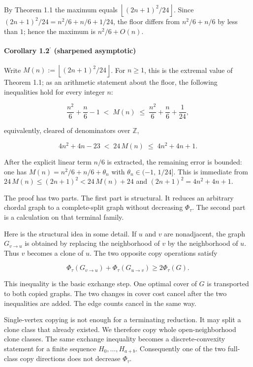 \documentclass[english,11pt,a4paper]{article}
\begin{document}
By Theorem 1.1 the maximum equals
\(\left\lfloor(2n+1)^2/24\right\rfloor\). Since
\((2n+1)^2/24=n^2/6+n/6+1/24\), the floor differs from \(n^2/6+n/6\) by
less than \(1\); hence the maximum is \(n^2/6+O(n)\).

\paragraph{\texorpdfstring{Corollary 1.2\(^{\prime}\) (sharpened
asymptotic)}{Corollary 1.2\^{}\{\textbackslash prime\} (sharpened asymptotic)}}\label{corollary-1.2prime-sharpened-asymptotic}

Write \(M(n):=\left\lfloor(2n+1)^2/24\right\rfloor\). For \(n\ge1\),
this is the extremal value of Theorem 1.1; as an arithmetic statement
about the floor, the following inequalities hold for every integer
\(n\):

\[
\frac{n^2}{6}+\frac{n}{6}-1
\;<\;
M(n)
\;\le\;
\frac{n^2}{6}+\frac{n}{6}+\frac{1}{24},
\]

equivalently, cleared of denominators over \(\mathbb Z\),

\[
4n^2+4n-23 \;<\; 24\,M(n) \;\le\; 4n^2+4n+1.
\]

After the explicit linear term \(n/6\) is extracted, the remaining error
is bounded: one has \(M(n)=n^2/6+n/6+\theta_n\) with
\(\theta_n\in(-1,\,1/24]\). This is immediate from
\(24\,M(n)\le(2n+1)^2<24\,M(n)+24\) and \((2n+1)^2=4n^2+4n+1\).

The proof has two parts. The first part is structural. It reduces an
arbitrary chordal graph to a complete-split graph without decreasing
\(\Phi_\tau\). The second part is a calculation on that terminal family.

Here is the structural idea in some detail. If \(u\) and \(v\) are
nonadjacent, the graph \(G_{v\to u}\) is obtained by replacing the
neighborhood of \(v\) by the neighborhood of \(u\). Thus \(v\) becomes a
clone of \(u\). The two opposite copy operations satisfy

\[
\Phi_\tau(G_{v\to u})
+
\Phi_\tau(G_{u\to v})
\ge
2\Phi_\tau(G).
\]

This inequality is the basic exchange step. One optimal cover of \(G\)
is transported to both copied graphs. The two changes in cover cost
cancel after the two inequalities are added. The edge counts cancel in
the same way.

Single-vertex copying is not enough for a terminating reduction. It may
split a clone class that already existed. We therefore copy whole
open-neighborhood clone classes. The same exchange inequality becomes a
discrete-convexity statement for a finite sequence
\(H_0,\ldots,H_{a+b}\). Consequently one of the two full-class copy
directions does not decrease \(\Phi_\tau\).
\end{document}
